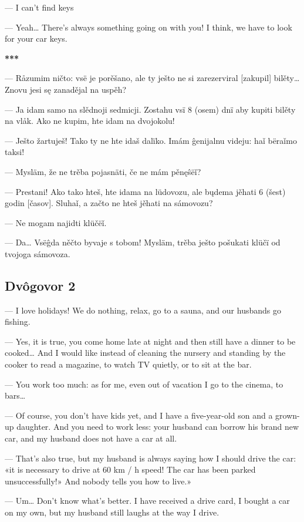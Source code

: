 — I can’t find keys

— Yeah… There’s always something going on with you! I think, we have to look for your car keys.

\begin{center}
	\textbf{***}
\end{center}

— Råzumim ničto: vsë je porěšano, ale ty ješto ne si zarezerviral [zakupil] bilěty… Znovu jesi sę zanadějal na uspěh?

— Ja idam samo na slědnoji sedmicji. Zostahu vsï 8 (osem) dnï aby kupiti bilěty na vlåk. Ako ne kupim, hte idam na dvojokolu!

— Ješto žartuješ! Tako ty ne hte idaš dalïko. Imám ĝenijalnu videju: haǐ bëraǐmo taksi!

— Mysläm, že ne trěba pojasnäti, če ne mám pěnęŝëǐ?

— Prestani! Ako tako hteš, hte idama na lüdovozu, ale bųdema jěhati 6 (šest) godin [časov]. Sluhaǐ, a začto ne hteš jěhati na sámovozu?

— Ne mogam najidti klüčëǐ.

— Da… Vsëĝda něčto byvaje s tobom! Mysläm, trěba ješto pošukati klüčï od tvojoga sámovoza.


\subsection{Dvôgovor 2}

— I love holidays! We do nothing, relax, go to a sauna, and our husbands go fishing.

— Yes, it is true, you come home late at night and then still have a dinner to be cooked… And I would like instead of cleaning the nursery and standing by the cooker to read a magazine, to watch TV quietly, or to sit at the bar.

— You work too much: as for me, even out of vacation I go to the cinema, to bars…

— Of course, you don’t have kids yet, and I have a five-year-old son and a grown-up daughter. And you need to work less: your husband can borrow his brand new car, and my husband does not have a car at all.

— That’s also true, but my husband is always saying how I should drive the car: «it is necessary to drive at 60 km / h speed! The car has been parked unsuccessfully!» And nobody tells you how to live.»

— Um… Don’t know what’s better. I have received a drive card, I bought a car on my own, but my husband still laughs at the way I drive.

